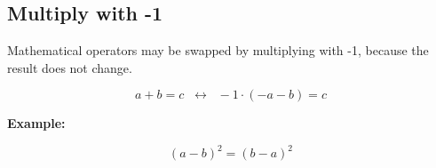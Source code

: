 
\vspace{0.5cm}\subsection{Multiply with -1}
\vspace{0.5cm}\begin{definition}\label{def-multiply-with-minus-one}
    
    Mathematical operators may be swapped by multiplying with -1, because the result does not change.
    
    \begin{equation}
         a+b = c\; \;\boldsymbol{\leftrightarrow}\; \;-1 \cdot (-a-b) = c \label{eq-31}
    \end{equation}

    \flushleft \normalfont \bfseries Example: 

    \begin{equation}
        (a-b)^2 = (b-a)^2 \label{eq-32}
    \end{equation}

\end{definition}


